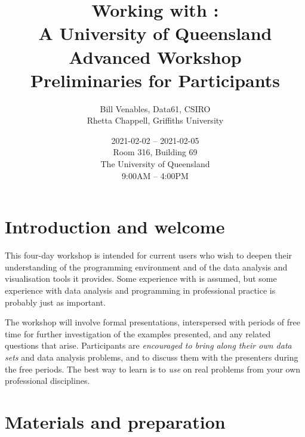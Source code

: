 \documentclass[12pt]{article}
\title{Working with \Rlogo:\\
  A University of Queensland Advanced Workshop\\[10pt]
Preliminaries for Participants}
\author{Bill Venables, Data61, CSIRO\\
Rhetta Chappell, Griffiths University}
\date{2021-02-02 -- 2021-02-05\\[10pt]
  Room 316, Building 69\\[5pt]
  The University of Queensland\\[5pt]
  9:00AM -- 4:00PM}
\begin{document}
\maketitle

\section{Introduction and welcome}
\label{sec:welcome}

This four-day workshop is intended for current \R users who wish to
deepen their understanding of the programming environment and of the
data analysis and visualisation tools it provides.  Some experience
with \R is assumed, but some experience with data analysis and
programming in professional practice is probably just as important.

The workshop will involve formal presentations, interspersed with
periods of free time for further investigation of the examples
presented, and any related questions that arise.  Participants are
\emph{encouraged to bring along their own data sets} and data analysis
problems, and to discuss them with the presenters during the free
periods.  The best way to learn \R is to \emph{use} \R on real
problems from your own professional disciplines.


\section{Materials and preparation}
\label{sec:prep}
\end{document}
